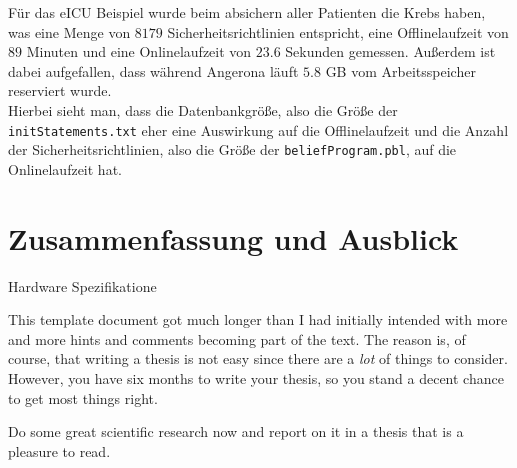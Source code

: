 \documentclass[german,version-2020-11]{uzl-thesis}
\begin{document}
Für das eICU Beispiel wurde beim absichern aller Patienten die Krebs haben, was eine Menge von $8179$ Sicherheitsrichtlinien entspricht, eine Offlinelaufzeit von $89$ Minuten und eine Onlinelaufzeit von $23.6$ Sekunden gemessen. Außerdem ist dabei aufgefallen, dass während Angerona läuft $5.8$ GB vom Arbeitsspeicher reserviert wurde. \\ 
Hierbei sieht man, dass die Datenbankgröße, also die Größe der \texttt{initStatements.txt} eher eine Auswirkung auf die Offlinelaufzeit und die Anzahl der Sicherheitsrichtlinien, also die Größe der \texttt{beliefProgram.pbl}, auf die Onlinelaufzeit hat.  

\chapter{Zusammenfassung und Ausblick} \label{chap:Zusammenfassung}

%


Hardware Spezifikatione

This template document got much longer than I had initially intended
with more and more hints and comments becoming part of the text. The
reason is, of course, that writing a thesis is not easy since there
are a \emph{lot} of things to consider. However, you have six months
to write your thesis, so you stand a decent chance to get most things 
right.

Do some great scientific research now and report on it in a thesis
that is a pleasure to read. 


\listoftodos



%
\end{document}
